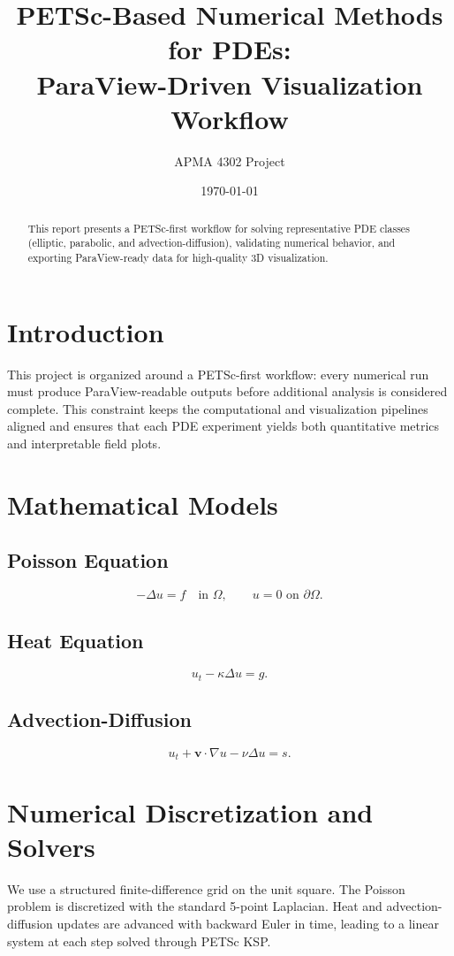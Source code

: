 \documentclass[11pt]{article}
\title{PETSc-Based Numerical Methods for PDEs:\\
ParaView-Driven Visualization Workflow}
\author{APMA 4302 Project}
\date{\today}
\begin{document}
\maketitle

\begin{abstract}
This report presents a PETSc-first workflow for solving representative PDE classes
(elliptic, parabolic, and advection-diffusion), validating numerical behavior, and
exporting ParaView-ready data for high-quality 3D visualization.
\end{abstract}

\section{Introduction}
This project is organized around a PETSc-first workflow: every numerical run must
produce ParaView-readable outputs before additional analysis is considered complete.
This constraint keeps the computational and visualization pipelines aligned and
ensures that each PDE experiment yields both quantitative metrics and interpretable
field plots.

\section{Mathematical Models}
\subsection{Poisson Equation}
\[
 -\Delta u = f \quad \text{in } \Omega,\qquad u=0 \text{ on } \partial\Omega.
\]
\subsection{Heat Equation}
\[
 u_t - \kappa \Delta u = g.
\]
\subsection{Advection-Diffusion}
\[
 u_t + \mathbf{v}\cdot\nabla u - \nu\Delta u = s.
\]

\section{Numerical Discretization and Solvers}
We use a structured finite-difference grid on the unit square.
The Poisson problem is discretized with the standard 5-point Laplacian.
Heat and advection-diffusion updates are advanced with backward Euler in time,
leading to a linear system at each step solved through PETSc KSP.
\end{document}
